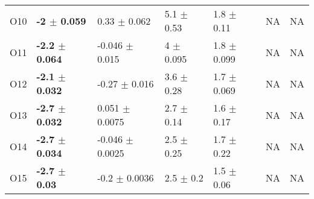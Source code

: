 \begin{table}[!htb]
\begin{tabular}{lllllll}
        O10    &  \textbf{-2    $\pm$  0.059}  &  0.33    $\pm$  0.062   &  5.1  $\pm$  0.53   &  1.8  $\pm$  0.11   &  NA      & NA \\
        O11    &  \textbf{-2.2  $\pm$  0.064}  &  -0.046  $\pm$  0.015   &  4    $\pm$  0.095  &  1.8  $\pm$  0.099  &  NA      & NA \\
        O12    &  \textbf{-2.1  $\pm$  0.032}  &  -0.27   $\pm$  0.016   &  3.6  $\pm$  0.28   &  1.7  $\pm$  0.069  &  NA      & NA \\
        O13    &  \textbf{-2.7  $\pm$  0.032}  &  0.051   $\pm$  0.0075  &  2.7  $\pm$  0.14   &  1.6  $\pm$  0.17   &  NA      & NA \\
        O14    &  \textbf{-2.7  $\pm$  0.034}  &  -0.046  $\pm$  0.0025  &  2.5  $\pm$  0.25   &  1.7  $\pm$  0.22   &  NA      & NA \\
        O15    &  \textbf{-2.7  $\pm$  0.03 }  &  -0.2    $\pm$  0.0036  &  2.5  $\pm$  0.2    &  1.5  $\pm$  0.06   &  NA      & NA \\
        \bottomrule
    \end{tabular}
\end{table}

